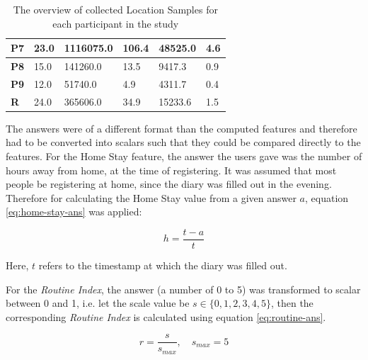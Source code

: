 \begin{table}[]
\begin{tabular}{|l|l|l|l|l|l|}
    \textbf{P7}                & 23.0                   & 1116075.0                       & 106.4                          & 48525.0                             & 4.6                                   \\ \hline
    \textbf{P8}                & 15.0                   & 141260.0                        & 13.5                           & 9417.3                              & 0.9                                   \\ \hline
    \textbf{P9}                & 12.0                   & 51740.0                         & 4.9                            & 4311.7                              & 0.4                                   \\ \hline
    \textbf{R}                 & 24.0                   & 365606.0                        & 34.9                           & 15233.6                             & 1.5                                   \\ \hline
    \end{tabular}
    \caption{The overview of collected Location Samples for each participant in the study}
    \label{tab:location-samples}
\end{table}

The answers were of a different format than the computed features and therefore had to be converted into scalars such that they could be compared directly to the  features. For the Home Stay feature, the answer the users gave was the number of hours away from home, at the time of registering. It was assumed that most people be registering at home, since the diary was filled out in the evening. Therefore for calculating the Home Stay value from a given answer $a$, equation \ref{eq:home-stay-ans} was applied:

\begin{equation}
\label{eq:home-stay-ans}
h = \frac{t - a }{t}
\end{equation}

Here, $t$ refers to the timestamp at which the diary was filled out.

For the \textit{Routine Index}, the answer (a number of 0 to 5) was transformed to scalar between 0 and 1, i.e. let the scale value be $s \in \{0, 1, 2, 3, 4, 5\}$, then the corresponding \textit{Routine Index} is calculated using equation \ref{eq:routine-ans}.

\begin{equation}
\label{eq:routine-ans}
    r = \frac{s}{s_{max}}, \quad s_{max} = 5
\end{equation}

